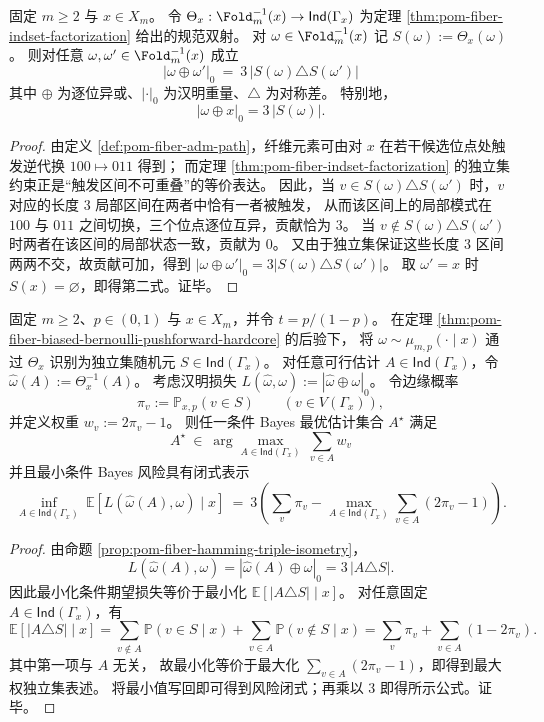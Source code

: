 \begin{proposition}[纤维汉明度量的三倍等距性]\label{prop:pom-fiber-hamming-triple-isometry}
固定 \(m\ge 2\) 与 \(x\in X_m\)。
令 \(\Theta_x:\Fold_m^{-1}(x)\to \mathsf{Ind}(\Gamma_x)\) 为定理 \ref{thm:pom-fiber-indset-factorization} 给出的规范双射。
对 \(\omega\in\Fold_m^{-1}(x)\) 记 \(S(\omega):=\Theta_x(\omega)\)。
则对任意 \(\omega,\omega'\in\Fold_m^{-1}(x)\) 成立
\[
\boxed{\;
|\omega\oplus\omega'|_0\ =\ 3\,\bigl|S(\omega)\triangle S(\omega')\bigr|\;}
\]
其中 \(\oplus\) 为逐位异或、\(|\cdot|_0\) 为汉明重量、\(\triangle\) 为对称差。
特别地，
\[
|\omega\oplus x|_0=3\,|S(\omega)|.
\]
\end{proposition}
\begin{proof}
由定义 \ref{def:pom-fiber-adm-path}，纤维元素可由对 \(x\) 在若干候选位点处触发逆代换 \(100\mapsto 011\) 得到；
而定理 \ref{thm:pom-fiber-indset-factorization} 的独立集约束正是“触发区间不可重叠”的等价表达。
因此，当 \(v\in S(\omega)\triangle S(\omega')\) 时，\(v\) 对应的长度 \(3\) 局部区间在两者中恰有一者被触发，
从而该区间上的局部模式在 \(100\) 与 \(011\) 之间切换，三个位点逐位互异，贡献恰为 \(3\)。
当 \(v\notin S(\omega)\triangle S(\omega')\) 时两者在该区间的局部状态一致，贡献为 \(0\)。
又由于独立集保证这些长度 \(3\) 区间两两不交，故贡献可加，得到
\(
|\omega\oplus\omega'|_0=3|S(\omega)\triangle S(\omega')|
\)。
取 \(\omega'=x\) 时 \(S(x)=\varnothing\)，即得第二式。证毕。
\end{proof}

\begin{theorem}\label{thm:pom-fiber-posterior-bayes-mwis}
固定 \(m\ge 2\)、\(p\in(0,1)\) 与 \(x\in X_m\)，并令 \(t=p/(1-p)\)。
在定理 \ref{thm:pom-fiber-biased-bernoulli-pushforward-hardcore} 的后验下，
将 \(\omega\sim\mu_{m,p}(\cdot\mid x)\) 通过 \(\Theta_x\) 识别为独立集随机元 \(S\in \mathsf{Ind}(\Gamma_x)\)。
对任意可行估计 \(A\in\mathsf{Ind}(\Gamma_x)\)，令 \(\widehat\omega(A):=\Theta_x^{-1}(A)\)。
考虑汉明损失
\(
L(\widehat\omega,\omega):=|\widehat\omega\oplus\omega|_0
\)。
令边缘概率
\[
\pi_v:=\mathbb P_{x,p}(v\in S)\qquad(v\in V(\Gamma_x)),
\]
并定义权重
\(
w_v:=2\pi_v-1
\)。
则任一条件 Bayes 最优估计集合 \(A^\star\) 满足
\[
\boxed{\;
A^\star\ \in\ \arg\max_{A\in\mathsf{Ind}(\Gamma_x)}\ \sum_{v\in A} w_v\;}
\]
并且最小条件 Bayes 风险具有闭式表示
\[
\boxed{\;
\inf_{A\in\mathsf{Ind}(\Gamma_x)}\ \mathbb E\!\left[L(\widehat\omega(A),\omega)\mid x\right]
\ =\ 3\left(\sum_{v}\pi_v-\max_{A\in\mathsf{Ind}(\Gamma_x)}\sum_{v\in A}(2\pi_v-1)\right).\;}
\]
\end{theorem}
\begin{proof}
由命题 \ref{prop:pom-fiber-hamming-triple-isometry}，
\[
L(\widehat\omega(A),\omega)
=|\widehat\omega(A)\oplus\omega|_0
=3\,|A\triangle S|.
\]
因此最小化条件期望损失等价于最小化 \(\mathbb E[|A\triangle S|\mid x]\)。
对任意固定 \(A\in\mathsf{Ind}(\Gamma_x)\)，有
\[
\mathbb E[|A\triangle S|\mid x]
=\sum_{v\notin A}\mathbb P(v\in S\mid x)+\sum_{v\in A}\mathbb P(v\notin S\mid x)
=\sum_v \pi_v+\sum_{v\in A}(1-2\pi_v).
\]
其中第一项与 \(A\) 无关，
故最小化等价于最大化 \(\sum_{v\in A}(2\pi_v-1)\)，即得到最大权独立集表述。
将最小值写回即可得到风险闭式；再乘以 \(3\) 即得所示公式。证毕。
\end{proof}

